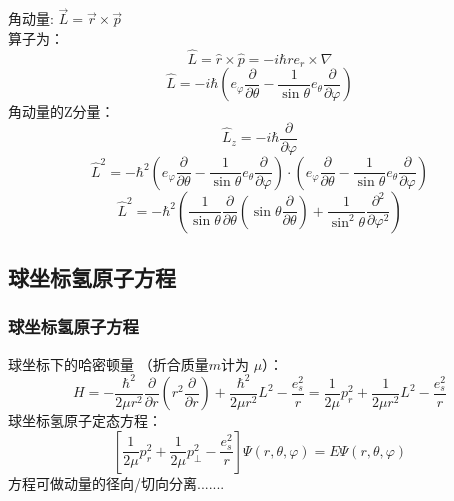 \begin{frame}
	角动量: $ \vec{L}= \vec{r}\times \vec{p} $\\
	算子为：
	\begin{equation*}
		\hat{L}= \hat{r}\times \hat{p} = -i \hbar r e_r \times \nabla  
	\end{equation*}
	\begin{equation*}
		\hat{L}=   -i \hbar   ( e_{\varphi} \frac{\partial}{\partial \theta} - \frac{1}{\sin \theta}  e_{\theta} \frac{\partial}{\partial \varphi} )
	\end{equation*}
	角动量的Z分量： 
	\begin{equation*}
		\hat{L}_z= -i \hbar \frac{\partial }{\partial\varphi }
	\end{equation*}	
	\begin{equation*}
		\hat{L}	^2 =   - \hbar ^2  ( e_{\varphi} \frac{\partial}{\partial \theta} - \frac{1}{\sin \theta}  e_{\theta} \frac{\partial}{\partial \varphi} )  \cdot   ( e_{\varphi} \frac{\partial}{\partial \theta} - \frac{1}{\sin \theta}  e_{\theta} \frac{\partial}{\partial \varphi} )
	\end{equation*}
	\begin{equation*}
		\hat{L}	^2 =  - \hbar ^2 (\frac{1}{\sin \theta  } \frac{\partial }{\partial \theta } (\sin \theta \frac{\partial }{\partial \theta } )
		+\frac{1}{\sin^2 \theta  } \frac{\partial^2}{\partial\varphi ^2} ) 
	\end{equation*}
\end{frame}	

\subsection{球坐标氢原子方程 }	

\begin{frame}
	\frametitle{ 球坐标氢原子方程 }	
	球坐标下的哈密顿量 （折合质量$m$计为 $\mu$）：
	\begin{equation*}
		H=-\frac{\hbar^2}{2 \mu r^2}  \frac{\partial }{\partial r} (r^2\frac{\partial }{\partial r} ) +  \frac{\hbar^2}{2 \mu r^2} L^2  -\frac{e_s ^2}{r} 
		= \frac{1}{2 \mu } p_r ^2 +  \frac{1}{2 \mu r^2} L^2  -\frac{e_s ^2}{r} 
	\end{equation*}	
	球坐标氢原子定态方程：	
	\begin{equation*}
		\left[ \frac{1}{2 \mu } p_r ^2 +  \frac{1}{2 \mu }	p_ \perp  ^2  -\frac{e_s ^2}{r}  \right] \Psi (r,\theta,\varphi) =E \Psi (r,\theta,\varphi)  
	\end{equation*}	
	方程可做动量的径向/切向分离.......\\
\end{frame}		

